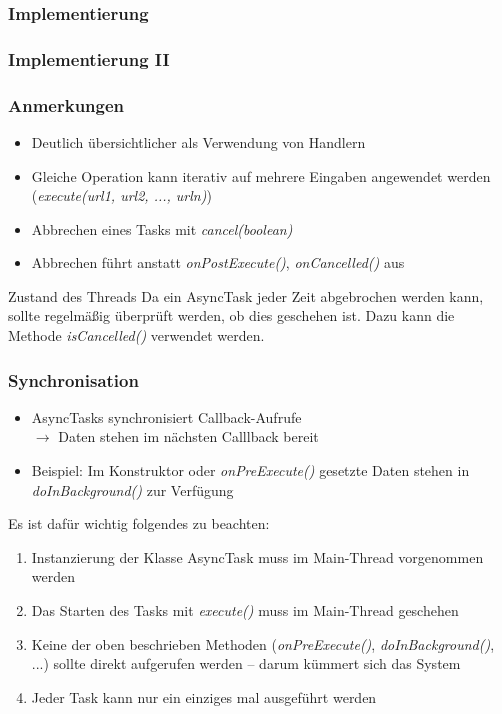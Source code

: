 \begin{frame}
   \frametitle{Implementierung}
	
\end{frame}

\begin{frame}
   \frametitle{Implementierung II}
	
\end{frame}

\begin{frame}
   \frametitle{Anmerkungen}
   \begin{itemize}
     	\item Deutlich übersichtlicher als Verwendung von Handlern
     	\item Gleiche Operation kann iterativ auf mehrere 
			Eingaben angewendet werden (\emph{execute(url1, url2, ..., urln)})
     	\item Abbrechen eines Tasks mit \emph{cancel(boolean)}
     	\item Abbrechen führt anstatt \emph{onPostExecute()}, \emph{onCancelled()} 
     		aus
   \end{itemize}
   
   \begin{alertblock}{Zustand des Threads}
   	Da ein AsyncTask jeder Zeit abgebrochen werden kann, sollte regelmäßig 
   	überprüft werden, ob dies geschehen ist. Dazu kann die Methode 
   	\emph{isCancelled()} verwendet werden.
   \end{alertblock}
\end{frame}

\begin{frame}
   \frametitle{Synchronisation}
   \begin{itemize}
     	\item AsyncTasks synchronisiert Callback-Aufrufe\\
     		$\rightarrow$ Daten stehen im nächsten Calllback bereit
     	\item Beispiel: Im Konstruktor oder \emph{onPreExecute()} gesetzte Daten 
     		stehen in \emph{doInBackground()} zur Verfügung 
   \end{itemize}

	Es ist dafür wichtig folgendes zu beachten:

	\begin{enumerate}
		\item Instanzierung der Klasse AsyncTask muss im Main-Thread vorgenommen werden
		\item Das Starten des Tasks mit \emph{execute()} muss im Main-Thread geschehen
		\item Keine der oben beschrieben Methoden (\emph{onPreExecute()}, \emph{doInBackground()}, ...) 
			sollte direkt aufgerufen werden -- darum kümmert sich das System
		\item Jeder Task kann nur ein einziges mal ausgeführt werden
	\end{enumerate}
\end{frame}

